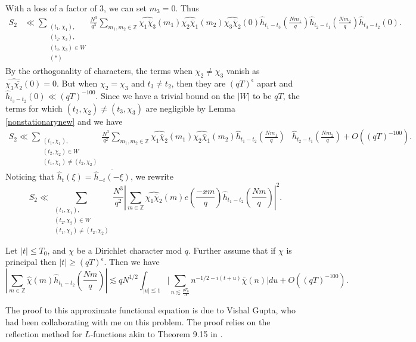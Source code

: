 With a loss of a factor of $3$, we can set $m_3=0$. Thus \begin{align*}
    S_2&\ll\sum_{\substack{(t_1,\chi_1),\\(t_2,\chi_2),\\(t_3,\chi_3)\in W \\ (*)}}
    \frac{N^3}{q^3}\sum_{m_1,m_2\in\mathbb{Z}}\widehat{{\chi_1{\overline{\chi}_3}}}(m_1)\widehat{\chi_2\overline{\chi}_1}(m_2)\widehat{\chi_3\overline{\chi}_2}(0) \hat{h}_{t_1-t_3}\left(\frac{Nm_1}{q}\right)\hat{h}_{t_2-t_1}\left(\frac{Nm_2}{q}\right)\hat{h}_{t_3-t_2}\left(0\right).
\end{align*}
By the orthogonality of characters, the terms when $\chi_2\neq \chi_3$ vanish as $\widehat{\chi_3\overline{\chi_2}}(0)=0.$ But when $\chi_2=\chi_3$ and $t_3\neq t_2$, then they are $(qT)^{\epsilon}$ apart and $\hat{h}_{t_3-t_2}(0)\ll (qT)^{-100}$. Since we have a trivial bound on the $|W|$ to be $qT$, 
 the terms for which $(t_2,\chi_2)\neq(t_3,\chi_3)$ are negligible by Lemma \ref{nonstationarynew} and we have \begin{align*}
	 S_2\ll\sum_{\substack{(t_1,\chi_1),\\(t_2,\chi_2)\in W \\ (t_1,\chi_1)\neq (t_2,\chi_2)}}
	\frac{N^3}{q^2}\sum_{m_1,m_2\in\mathbb{Z}}\widehat{{\chi_1{\overline{\chi}_2}}}(m_1)\widehat{\chi_2\overline{\chi}_1}(m_2)
	\hat{h}_{t_1-t_2}\left(\frac{Nm_1}{q}\right)&\hat{h}_{t_2-t_1}\left(\frac{Nm_2}{q}\right)+O((qT)^{-100}).
\end{align*}   
Noticing that $\hat{h}_t(\xi)=\overline{\hat{h}_{-t}(-\xi)}$, we rewrite \begin{equation} \label{S2clean}
    S_2 \ll\sum_{\substack{(t_1,\chi_1),\\(t_2,\chi_2)\in W \\ (t_1,\chi_1)\neq (t_2,\chi_2)}}
    \frac{N^3}{q^2}\left|\sum_{m \in \mathbb{Z}}\widehat{{\chi_1{\overline{\chi}_2}}}(m) e\left(\frac{-xm}{q}\right)
    \hat{h}_{t_1-t_2}\left(\frac{Nm}{q}\right)\right|^2.
\end{equation}
\begin{lemma}
    Let $|t|\leq T_0$, and $\chi$ be a Dirichlet character mod $q$. Further assume that if $\chi$ is principal then $|t|\geq (qT)^{\epsilon}$. Then we have \[
        \left|\sum_{m \in \mathbb{Z}}\hat{{\chi}}(m)
        \hat{h}_{t_1-t_2}\left(\frac{Nm}{q}\right)\right|\lesssim qN^{1/2}\int_{|u|\lesssim 1}\Big|\sum_{n\lesssim \frac{qT_0}{N}}n^{-1/2-i(t+u)}\bar{\chi}(n)\Big| du + O((qT)^{-100}).
    \]
\end{lemma}
The proof to this approximate functional equation is due to Vishal Gupta, who had been collaborating with me on this problem. The proof relies on the reflection method for $L$-functions akin to Theorem 9.15 in \cite{iwaniec}. 

